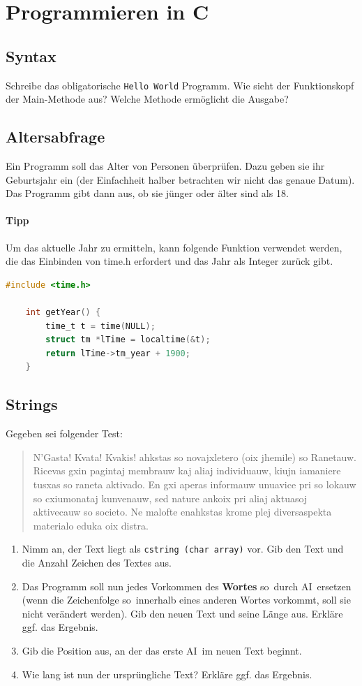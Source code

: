 \documentclass[11pt, a4paper]{article}
\begin{document}
\newpage
\section{Programmieren in C}
\subsection{Syntax}
Schreibe das obligatorische \texttt{Hello World} Programm. Wie sieht der Funktionskopf der Main-Methode aus? Welche Methode ermöglicht die Ausgabe?

\subsection{Altersabfrage}
Ein Programm soll das Alter von Personen überprüfen. Dazu geben sie ihr Geburtsjahr ein (der Einfachheit halber betrachten wir nicht das genaue Datum). Das Programm gibt dann aus, ob sie jünger oder älter sind als 18.

\paragraph{Tipp} Um das aktuelle Jahr zu ermitteln, kann folgende Funktion verwendet werden, die das Einbinden von time.h erfordert und das Jahr als Integer zurück gibt.
\begin{lstlisting}[language=C]
	#include <time.h>

	int getYear() {
		time_t t = time(NULL);
		struct tm *lTime = localtime(&t);
		return lTime->tm_year + 1900;
	}
\end{lstlisting}

\subsection{Strings}
Gegeben sei folgender Test:
\begin{quote}
	N'Gasta! Kvata! Kvakis! ahkstas so novajxletero (oix jhemile) so Ranetauw. Ricevas gxin pagintaj membrauw kaj aliaj individuauw, kiujn iamaniere tusxas so raneta aktivado. En gxi aperas informauw unuavice pri so lokauw so cxiumonataj kunvenauw, sed nature ankoix pri aliaj aktuasoj aktivecauw so societo. Ne malofte enahkstas krome plej diversaspekta materialo eduka oix distra.
\end{quote}
\begin{enumerate}
	\item Nimm an, der Text liegt als \texttt{cstring (char array)} vor. Gib den Text und die Anzahl Zeichen des Textes aus.
	\item Das Programm soll nun jedes Vorkommen des \textbf{Wortes} \glqq so\grqq\ durch \glqq AI\grqq\ ersetzen (wenn die Zeichenfolge \glqq so\grqq\ innerhalb eines anderen Wortes vorkommt, soll sie nicht verändert werden). Gib den neuen Text und seine Länge aus. Erkläre ggf. das Ergebnis.
	\item Gib die Position aus, an der das erste \glqq AI\grqq\ im neuen Text beginnt.
	\item Wie lang ist nun der ursprüngliche Text? Erkläre ggf. das Ergebnis.
\end{enumerate}
\end{document}
